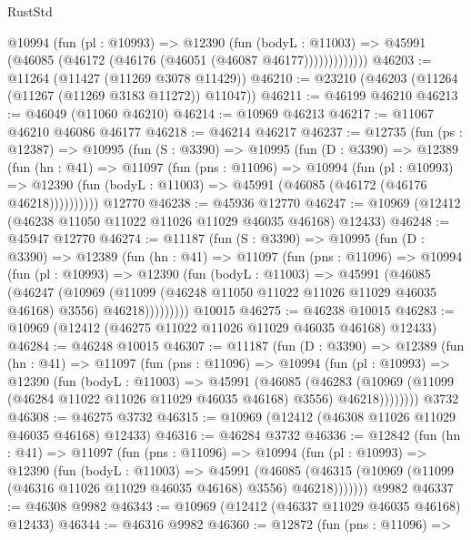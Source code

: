 \begin{lexlean}{RustStd}
\begin{coremodule}
              @10994
                (fun (pl : @10993) =>
                @12390
                  (fun (bodyL : @11003) =>
                  @45991 (@46085 (@46172 (@46176 (@46051 (@46087 @46177)))))))))))))
@46203 := @11264 (@11427 (@11269 @3078 @11429))
@46210 := @23210 (@46203 (@11264 (@11267 (@11269 @3183 @11272)) @11047))
@46211 := @46199 @46210
@46213 := @46049 (@11060 @46210)
@46214 := @10969 @46213
@46217 := @11067 @46210 @46086 @46177
@46218 := @46214 @46217
@46237 := @12735
    (fun (ps : @12387) =>
    @10995
      (fun (S : @3390) =>
      @10995
        (fun (D : @3390) =>
        @12389
          (fun (hn : @41) =>
          @11097
            (fun (pns : @11096) =>
            @10994
              (fun (pl : @10993) =>
              @12390 (fun (bodyL : @11003) => @45991 (@46085 (@46172 (@46176 @46218))))))))))
    @12770
@46238 := @45936 @12770
@46247 := @10969 (@12412 (@46238 @11050 @11022 @11026 @11029 @46035 @46168) @12433)
@46248 := @45947 @12770
@46274 := @11187
    (fun (S : @3390) =>
    @10995
      (fun (D : @3390) =>
      @12389
        (fun (hn : @41) =>
        @11097
          (fun (pns : @11096) =>
          @10994
            (fun (pl : @10993) =>
            @12390
              (fun (bodyL : @11003) =>
              @45991
                (@46085
                  (@46247
                    (@10969
                      (@11099 (@46248 @11050 @11022 @11026 @11029 @46035 @46168) @3556)
                      @46218)))))))))
    @10015
@46275 := @46238 @10015
@46283 := @10969 (@12412 (@46275 @11022 @11026 @11029 @46035 @46168) @12433)
@46284 := @46248 @10015
@46307 := @11187
    (fun (D : @3390) =>
    @12389
      (fun (hn : @41) =>
      @11097
        (fun (pns : @11096) =>
        @10994
          (fun (pl : @10993) =>
          @12390
            (fun (bodyL : @11003) =>
            @45991
              (@46085
                (@46283
                  (@10969 (@11099 (@46284 @11022 @11026 @11029 @46035 @46168) @3556) @46218))))))))
    @3732
@46308 := @46275 @3732
@46315 := @10969 (@12412 (@46308 @11026 @11029 @46035 @46168) @12433)
@46316 := @46284 @3732
@46336 := @12842
    (fun (hn : @41) =>
    @11097
      (fun (pns : @11096) =>
      @10994
        (fun (pl : @10993) =>
        @12390
          (fun (bodyL : @11003) =>
          @45991
            (@46085
              (@46315 (@10969 (@11099 (@46316 @11026 @11029 @46035 @46168) @3556) @46218)))))))
    @9982
@46337 := @46308 @9982
@46343 := @10969 (@12412 (@46337 @11029 @46035 @46168) @12433)
@46344 := @46316 @9982
@46360 := @12872
    (fun (pns : @11096) =>

\end{coremodule}
\end{lexlean}
